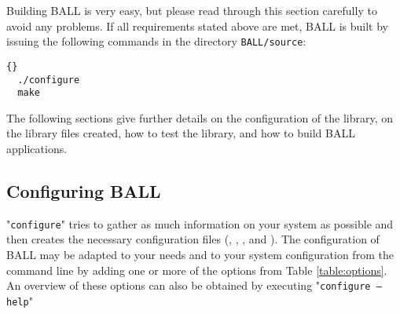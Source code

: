 Building BALL is very easy, but please read through this section carefully to
avoid any problems.  If all requirements stated above are met, BALL is built
by issuing the following commands in the directory {\tt BALL/source}:

\begin{lstlisting}{}
  ./configure
  make
\end{lstlisting}

The following sections give further details on the configuration of the library,
on the library files created, how to test the library, and how to build BALL 
applications.

\subsection{Configuring BALL}

"{\tt configure}" tries to gather as much information on your system as possible and 
then creates the necessary configuration files (,
, , and ).
The configuration of BALL may be adapted to your needs and to your system
configuration from the command line by adding one or more of the options from
Table \ref{table:options}.
An overview of these options can also be obtained by executing "{\tt configure
--help}"

